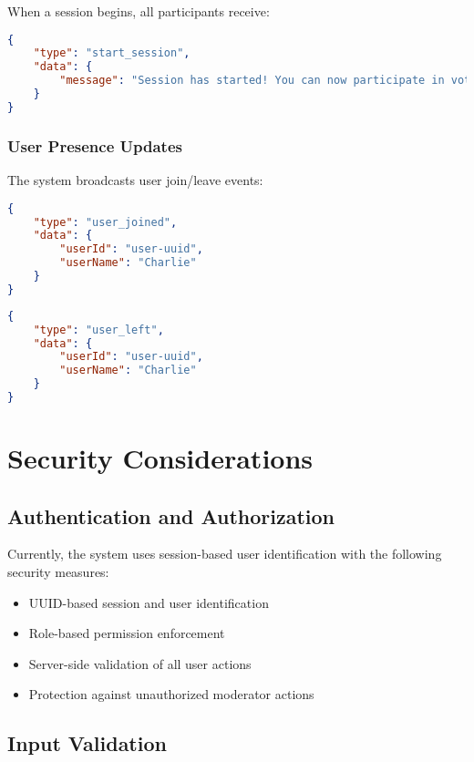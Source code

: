 \documentclass[11pt,a4paper]{article}
\begin{document}
When a session begins, all participants receive:

\begin{lstlisting}[language=json, caption=Session Start Message]
{
    "type": "start_session",
    "data": {
        "message": "Session has started! You can now participate in voting."
    }
}
\end{lstlisting}

\subsubsection{User Presence Updates}

The system broadcasts user join/leave events:

\begin{lstlisting}[language=json, caption=User Joined Message]
{
    "type": "user_joined",
    "data": {
        "userId": "user-uuid",
        "userName": "Charlie"
    }
}
\end{lstlisting}

\begin{lstlisting}[language=json, caption=User Left Message]
{
    "type": "user_left",
    "data": {
        "userId": "user-uuid",
        "userName": "Charlie"
    }
}
\end{lstlisting}

\section{Security Considerations}

\subsection{Authentication and Authorization}

Currently, the system uses session-based user identification with the following security measures:

\begin{itemize}
    \item UUID-based session and user identification
    \item Role-based permission enforcement
    \item Server-side validation of all user actions
    \item Protection against unauthorized moderator actions
\end{itemize}

\subsection{Input Validation}
\end{document}
